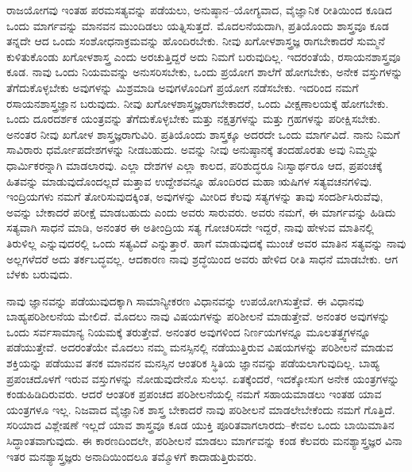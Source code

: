 ರಾಜಯೋಗವು ಇಂತಹ ಪರಮಸತ್ಯವನ್ನು ಪಡೆಯಲು, ಅನುಷ್ಠಾನ–ಯೋಗ್ಯವಾದ, ವೈಜ್ಞಾನಿಕ ರೀತಿಯಿಂದ ಕೂಡಿದ ಒಂದು ಮಾರ್ಗವನ್ನು ಮಾನವನ ಮುಂದಿಡಲು ಯತ್ನಿಸುತ್ತದೆ. ಮೊದಲನೆಯದಾಗಿ, ಪ್ರತಿಯೊಂದು ಶಾಸ್ತ್ರವೂ ಕೂಡ ತನ್ನದೇ ಆದ ಒಂದು ಸಂಶೋಧನಾಕ್ರಮವನ್ನು ಹೊಂದಿರಬೇಕು. ನೀವು ಖಗೋಳಶಾಸ್ತ್ರಜ್ಞ ರಾಗಬೇಕಾದರೆ ಸುಮ್ಮನೆ ಕುಳಿತುಕೊಂಡು ಖಗೋಳಶಾಸ್ತ್ರ ಎಂದು ಅರಚುತ್ತಿದ್ದರೆ ಅದು ನಿಮಗೆ ಬರುವುದಿಲ್ಲ. ಇದರಂತೆಯೆ, ರಸಾಯನಶಾಸ್ತ್ರವೂ ಕೂಡ. ನಾವು ಒಂದು ನಿಯಮವನ್ನು ಅನುಸರಿಸಬೇಕು, ಒಂದು ಪ್ರಯೋಗ ಶಾಲೆಗೆ ಹೋಗಬೇಕು, ಅನೇಕ ವಸ್ತುಗಳನ್ನು ತೆಗೆದುಕೊಳ್ಳಬೇಕು ಅವುಗಳನ್ನು ಮಿಶ್ರಮಾಡಿ ಅವುಗಳೊಂದಿಗೆ ಪ್ರಯೋಗ ನಡೆಸಬೇಕು. ಇದರಿಂದ ನಮಗೆ ರಸಾಯನಶಾಸ್ತ್ರಜ್ಞಾನ ಬರುವುದು. ನೀವು ಖಗೋಳಶಾಸ್ತ್ರಜ್ಞರಾಗಬೇಕಾದರೆ, ಒಂದು ವೀಕ್ಷಣಾಲಯಕ್ಕೆ ಹೋಗಬೇಕು. ಒಂದು ದೂರದರ್ಶಕ ಯಂತ್ರವನ್ನು ತೆಗೆದುಕೊಳ್ಳಬೇಕು ಮತ್ತು ನಕ್ಷತ್ರಗಳನ್ನು ಮತ್ತು ಗ್ರಹಗಳನ್ನು ಪರೀಕ್ಷಿಸಬೇಕು. ಅನಂತರ ನೀವು ಖಗೋಳ ಶಾಸ್ತ್ರಜ್ಞರಾಗುವಿರಿ. ಪ್ರತಿಯೊಂದು ಶಾಸ್ತ್ರಕ್ಕೂ ಅದರದೇ ಒಂದು ಮಾರ್ಗವಿದೆ. ನಾನು ನಿಮಗೆ ಸಾವಿರಾರು ಧರ್ಮೋಪದೇಶಗಳನ್ನು ನೀಡಬಹುದು. ಅವನ್ನು ನೀವು ಅನುಷ್ಠಾನಕ್ಕೆ ತಂದಹೊರತು ಅವು ನಿಮ್ಮನ್ನು ಧಾರ್ಮಿಕರನ್ನಾಗಿ ಮಾಡಲಾರವು. ಎಲ್ಲಾ ದೇಶಗಳ ಎಲ್ಲಾ ಕಾಲದ, ಪರಿಶುದ್ಧರೂ ನಿಃಸ್ವಾರ್ಥರೂ ಆದ, ಪ್ರಪಂಚಕ್ಕೆ ಹಿತವನ್ನು ಮಾಡುವುದೊಂದಲ್ಲದೆ ಮತ್ತಾವ ಉದ್ದೇಶವನ್ನೂ ಹೊಂದಿರದ ಮಹಾ ಋಷಿಗಳ ಸತ್ಯವಚನಗಳಿವು. ಇಂದ್ರಿಯಗಳು ನಮಗೆ ತೋರಿಸುವುದಕ್ಕಿಂತ, ಅವುಗಳನ್ನು ಮೀರಿದ ಕೆಲವು ಸತ್ಯಗಳನ್ನು ತಾವು ಸಂದರ್ಶಿಸಿರುವೆವು, ಅವನ್ನು ಬೇಕಾದರೆ ಪರೀಕ್ಷೆ ಮಾಡಬಹುದು ಎಂದು ಅವರು ಸಾರುವರು. ಅವರು ನಮಗೆ, ಈ ಮಾರ್ಗವನ್ನು ಹಿಡಿದು ಸತ್ಯವಾಗಿ ಸಾಧನೆ ಮಾಡಿ, ಅನಂತರ ಈ ಅತೀಂದ್ರಿಯ ಸತ್ಯ ಗೋಚರಿಸದೇ ಇದ್ದರೆ, ನಾವು ಹೇಳುವ ಮಾತಿನಲ್ಲಿ ತಿರುಳಿಲ್ಲ ಎನ್ನುವುದರಲ್ಲಿ ಒಂದು ಸತ್ಯವಿದೆ ಎನ್ನುತ್ತಾರೆ. ಹಾಗೆ ಮಾಡುವುದಕ್ಕೆ ಮುಂಚೆ ಅವರ ಮಾತಿನ ಸತ್ಯವನ್ನು ನಾವು ಅಲ್ಲಗಳೆದರೆ ಅದು ತರ್ಕಬದ್ಧವಲ್ಲ. ಆದಕಾರಣ ನಾವು ಶ್ರದ್ಧೆಯಿಂದ ಅವರು ಹೇಳಿದ ರೀತಿ ಸಾಧನೆ ಮಾಡಬೇಕು. ಆಗ ಬೆಳಕು ಬರುವುದು. 

\vskip 5pt

ನಾವು ಜ್ಞಾನವನ್ನು ಪಡೆಯುವುದಕ್ಕಾಗಿ ಸಾಮಾನ್ಯೀಕರಣ ವಿಧಾನವನ್ನು ಉಪ\break ಯೋಗಿಸುತ್ತೇವೆ. ಈ ವಿಧಾನವು ಬಾಹ್ಯಪರಿಶೀಲನೆಯ ಮೇಲಿದೆ. ಮೊದಲು ನಾವು ವಿಷಯಗಳನ್ನು ಪರಿಶೀಲನೆ ಮಾಡುತ್ತೇವೆ. ಅನಂತರ ಅವುಗಳನ್ನು ಒಂದು ಸರ್ವಸಾಮಾನ್ಯ ನಿಯಮಕ್ಕೆ ತರುತ್ತೇವೆ. ಅನಂತರ ಅವುಗಳಿಂದ ನಿರ್ಣಯಗಳನ್ನೂ ಮೂಲತತ್ತ್ವಗಳನ್ನೂ ಪಡೆಯುತ್ತೇವೆ. ಅದರಂತೆಯೇ ಮೊದಲು ನಮ್ಮ ಮನಸ್ಸಿನಲ್ಲಿ ನಡೆಯುತ್ತಿರುವ ವಿಷಯಗಳನ್ನು ಪರಿಶೀಲನೆ ಮಾಡುವ ಶಕ್ತಿಯನ್ನು ಪಡೆಯುವ ತನಕ ಮಾನವನ ಮನಸ್ಸಿನ ಆಂತರಿಕ ಸ್ಥಿತಿಯ ಜ್ಞಾನವನ್ನು ಪಡೆಯಲಾಗುವುದಿಲ್ಲ. ಬಾಹ್ಯ ಪ್ರಪಂಚದೊಳಗೆ ಇರುವ ವಸ್ತುಗಳನ್ನು ನೋಡುವುದೇನೊ ಸುಲಭ. ಏತಕ್ಕೆಂದರೆ, ಇದಕ್ಕೋಸುಗ ಅನೇಕ ಯಂತ್ರಗಳನ್ನು ಕಂಡುಹಿಡಿದಿರುವರು. ಆದರೆ ಆಂತರಿಕ ಪ್ರಪಂಚದ ಪರಿಶೀಲನೆಯಲ್ಲಿ ನಮಗೆ ಸಹಾಯಮಾಡಲು ಇಂತಹ ಯಾವ ಯಂತ್ರಗಳೂ ಇಲ್ಲ. ನಿಜವಾದ ವೈಜ್ಞಾನಿಕ ಶಾಸ್ತ್ರ ಬೇಕಾದರೆ ನಾವು ಪರಿಶೀಲನೆ ಮಾಡಲೇಬೇಕೆಂದು ನಮಗೆ ಗೊತ್ತಿದೆ. ಸರಿಯಾದ ವಿಶ್ಲೇಷಣೆ ಇಲ್ಲದೆ ಯಾವ ಶಾಸ್ತ್ರವೂ ಕೂಡ ಯುಕ್ತಿ ಪೂರಿತವಾಗಲಾರದು–ಕೇವಲ ಒಂದು ಬಾಯಿಮಾತಿನ ಸಿದ್ಧಾಂತವಾಗುವುದು. ಈ ಕಾರಣದಿಂದಲೇ, ಪರಿಶೀಲನೆ ಮಾಡಲು ಮಾರ್ಗವನ್ನು ಕಂಡ ಕೆಲವರು ಮನಶ್ಯಾಸ್ತ್ರಜ್ಞರ ವಿನಾ ಇತರ ಮನಶ್ಯಾಸ್ತ್ರಜ್ಞರು ಅನಾದಿಯಿಂದಲೂ ತಮ್ಮೊಳಗೆ ಕಾದಾಡುತ್ತಿರುವರು. 

\vskip 5pt

